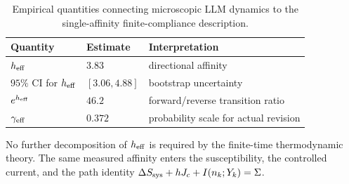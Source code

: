 \begin{table}[t]
\centering
\caption{Empirical quantities connecting microscopic LLM dynamics to the
single-affinity finite-compliance description.}
\label{tab:effective_affinity_summary}
\begin{tabular}{lll}
\toprule
Quantity & Estimate & Interpretation \\
\midrule
$h_{\rm eff}$ & $3.83$ & directional affinity \\
$95\%$ CI for $h_{\rm eff}$ & $[3.06,4.88]$ & bootstrap uncertainty \\
$e^{h_{\rm eff}}$ & $46.2$ & forward/reverse transition ratio \\
$\gamma_{\rm eff}$ & $0.372$ & probability scale for actual revision \\
\bottomrule
\end{tabular}
\end{table}

No further decomposition of $h_{\rm eff}$ is required by the finite-time
thermodynamic theory. The same measured affinity enters the susceptibility,
the controlled current, and the path identity
$\Delta S_{\rm sys}+hJ_c+I(n_k;Y_k)=\Sigma$.
